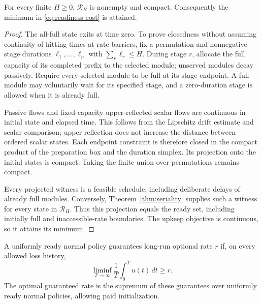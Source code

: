 \begin{lemma}
\label{lemma:compactness}
For every finite \(H\geq0\), \(\mathcal R_H\) is nonempty and compact.
Consequently the minimum in \eqref{eq:readiness-cost} is attained.
\end{lemma}
\begin{proof}
The all-full state exits at time zero. To prove closedness without assuming
continuity of hitting times at rate barriers, fix a permutation and
nonnegative stage durations \(\ell_1,\ldots,\ell_n\) with
\(\sum_r\ell_r\leq H\). During stage \(r\), allocate the full capacity of its
completed prefix to the selected module; unserved modules decay passively.
Require every selected module to be full at its stage endpoint. A full
module may voluntarily wait for its specified stage, and a zero-duration
stage is allowed when it is already full.

Passive flows and fixed-capacity upper-reflected scalar flows are continuous
in initial state and elapsed time. This follows from the Lipschitz drift
estimate and scalar comparison; upper reflection does not increase the
distance between ordered scalar states. Each endpoint constraint is
therefore closed in the compact product of the preparation box and the
duration simplex. Its projection onto the initial states is compact.
Taking the finite union over permutations remains compact.

Every projected witness is a feasible schedule, including deliberate
delays of already full modules. Conversely, Theorem~\ref{thm:seriality}
supplies such a witness for every state in \(\mathcal R_H\). Thus this
projection equals the ready set, including initially full and inaccessible-rate
boundaries. The upkeep objective is continuous, so it attains its minimum.
\end{proof}

A uniformly ready normal policy guarantees long-run optional rate \(r\) if,
on every allowed loss history,
\[
 \liminf_{T\to\infty}\frac1T\int_0^T u(t)\,dt\geq r.
\]
The optimal guaranteed rate is the supremum of these guarantees over
uniformly ready normal policies, allowing paid initialization.

